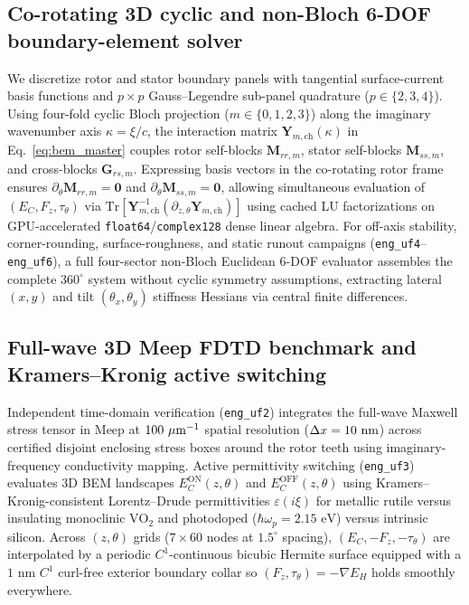 \documentclass[11pt,a4paper]{article}
\begin{document}
\subsection*{Co-rotating 3D cyclic and non-Bloch 6-DOF boundary-element solver}
We discretize rotor and stator boundary panels with tangential surface-current basis functions and $p \times p$ Gauss--Legendre sub-panel quadrature ($p \in \{2,3,4\}$). Using four-fold cyclic Bloch projection ($m \in \{0,1,2,3\}$) along the imaginary wavenumber axis $\kappa = \xi/c$, the interaction matrix $\mathbf{Y}_{m,\mathrm{ch}}(\kappa)$ in Eq.~\eqref{eq:bem_master} couples rotor self-blocks $\mathbf{M}_{rr,m}$, stator self-blocks $\mathbf{M}_{ss,m}$, and cross-blocks $\mathbf{G}_{rs,m}$. Expressing basis vectors in the co-rotating rotor frame ensures $\partial_\theta \mathbf{M}_{rr,m} = \mathbf{0}$ and $\partial_\theta \mathbf{M}_{ss,m} = \mathbf{0}$, allowing simultaneous evaluation of $(E_C, F_z, \tau_\theta)$ via $\mathrm{Tr}[\mathbf{Y}_{m,\mathrm{ch}}^{-1}(\partial_{z,\theta}\mathbf{Y}_{m,\mathrm{ch}})]$ using cached LU factorizations on GPU-accelerated \texttt{float64}/\texttt{complex128} dense linear algebra. For off-axis stability, corner-rounding, surface-roughness, and static runout campaigns (\texttt{eng\_uf4}--\texttt{eng\_uf6}), a full four-sector non-Bloch Euclidean 6-DOF evaluator assembles the complete $360^\circ$ system without cyclic symmetry assumptions, extracting lateral $(x,y)$ and tilt $(\theta_x,\theta_y)$ stiffness Hessians via central finite differences.

\subsection*{Full-wave 3D Meep FDTD benchmark and Kramers--Kronig active switching}
Independent time-domain verification (\texttt{eng\_uf2}) integrates the full-wave Maxwell stress tensor in Meep\cite{rodriguez2009fdtd,oskooi2010meep} at $\EngineUftwoResolution{}\ \mu\text{m}^{-1}$ spatial resolution ($\Delta x = 10{}\text{ nm}$) across certified disjoint enclosing stress boxes around the rotor teeth using imaginary-frequency conductivity mapping. Active permittivity switching (\texttt{eng\_uf3}) evaluates 3D BEM landscapes $E_C^{\mathrm{ON}}(z,\theta)$ and $E_C^{\mathrm{OFF}}(z,\theta)$ using Kramers--Kronig-consistent Lorentz--Drude permittivities $\varepsilon(i\xi)$ for metallic rutile versus insulating monoclinic $\mathrm{VO}_2$\cite{qazilbash2007,pirozhenko2008vo2} and photodoped ($\hbar\omega_p = 2.15\text{ eV}$) versus intrinsic silicon\cite{chen2007light}. Across $(z,\theta)$ grids ($7 \times 60$ nodes at $1.5^\circ$ spacing), $(E_C,-F_z,-\tau_\theta)$ are interpolated by a periodic $C^1$-continuous bicubic Hermite surface equipped with a $1\text{ nm}$ $C^1$ curl-free exterior boundary collar so $(F_z,\tau_\theta) = -\nabla E_H$ holds smoothly everywhere.
\end{document}
